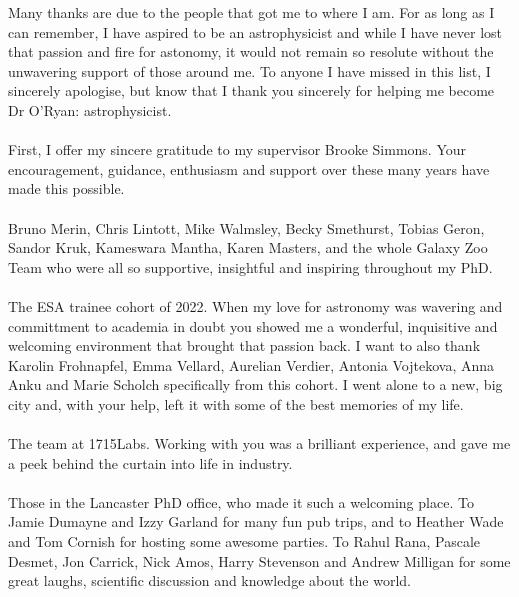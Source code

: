 

\begin{acknowledgements}      %
Many thanks are due to the people that got me to where I am. For as long as I can remember, I have aspired to be an astrophysicist and while I have never lost that passion and fire for astonomy, it would not remain so resolute without the unwavering support of those around me. To anyone I have missed in this list, I sincerely apologise, but know that I thank you sincerely for helping me become Dr O'Ryan: astrophysicist.
\\
\\
First, I offer my sincere gratitude to my supervisor Brooke Simmons. Your encouragement, guidance, enthusiasm and support over these many years have made this possible.
\\
\\
Bruno Merin, Chris Lintott, Mike Walmsley, Becky Smethurst, Tobias Geron, Sandor Kruk, Kameswara Mantha, Karen Masters, and the whole Galaxy Zoo Team who were all so supportive, insightful and inspiring throughout my PhD. 
\\
\\
The ESA trainee cohort of 2022. When my love for astronomy was wavering and committment to academia in doubt you showed me a wonderful, inquisitive and welcoming environment that brought that passion back. I want to also thank Karolin Frohnapfel, Emma Vellard, Aurelian Verdier, Antonia Vojtekova, Anna Anku and Marie Scholch specifically from this cohort. I went alone to a new, big city and, with your help, left it with some of the best memories of my life.  
\\
\\
The team at 1715Labs. Working with you was a brilliant experience, and gave me a peek behind the curtain into life in industry.
\\
\\
Those in the Lancaster PhD office, who made it such a welcoming place. To Jamie Dumayne and Izzy Garland for many fun pub trips, and to Heather Wade and Tom Cornish for hosting some awesome parties. To Rahul Rana, Pascale Desmet, Jon Carrick, Nick Amos, Harry Stevenson and Andrew Milligan for some great laughs, scientific discussion and knowledge about the world.

\end{acknowledgements}
